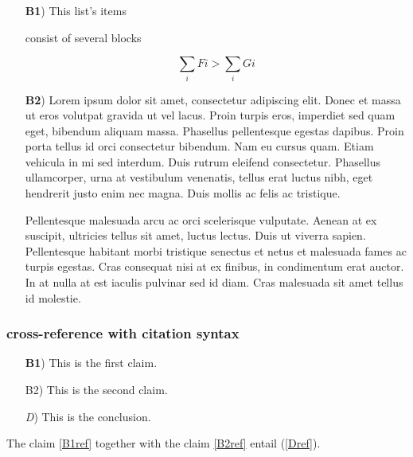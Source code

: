 \documentclass[
]{article}
\makeatletter
\providecommand{\tightlist}{%
  \setlength{\itemsep}{0pt}\setlength{\parskip}{0pt}}
\def\labelledlistlabel#1#2{\begingroup
    \def\@currentlabel{#2}%
    \label{#1}\endgroup
    }
\makeatother
\begin{document}
\begin{itemize}
\tightlist

\item[\textbf{B1})] This list's items

consist of several blocks

\[\sum_i Fi > \sum_i Gi\]

\item[\textbf{B2})] Lorem ipsum dolor sit amet, consectetur adipiscing
elit. Donec et massa ut eros volutpat gravida ut vel lacus. Proin turpis
eros, imperdiet sed quam eget, bibendum aliquam massa. Phasellus
pellentesque egestas dapibus. Proin porta tellus id orci consectetur
bibendum. Nam eu cursus quam. Etiam vehicula in mi sed interdum. Duis
rutrum eleifend consectetur. Phasellus ullamcorper, urna at vestibulum
venenatis, tellus erat luctus nibh, eget hendrerit justo enim nec magna.
Duis mollis ac felis ac tristique.

Pellentesque malesuada arcu ac orci scelerisque vulputate. Aenean at ex
suscipit, ultricies tellus sit amet, luctus lectus. Duis ut viverra
sapien. Pellentesque habitant morbi tristique senectus et netus et
malesuada fames ac turpis egestas. Cras consequat nisi at ex finibus, in
condimentum erat auctor. In at nulla at est iaculis pulvinar sed id
diam. Cras malesuada sit amet tellus id molestie.

\end{itemize}

\hypertarget{cross-reference-with-citation-syntax}{%
\subsubsection{cross-reference with citation
syntax}\label{cross-reference-with-citation-syntax}}

\begin{itemize}
\tightlist

\item[\textbf{B1})\labelledlistlabel{B1ref}{\textbf{B1}}] This is the
first claim.

\item[B2)\labelledlistlabel{B2ref}{B2}] This is the second claim.

\item[\emph{D})\labelledlistlabel{Dref}{\emph{D}}] This is the
conclusion.

\end{itemize}

The claim \ref{B1ref} together with the claim \ref{B2ref} entail
(\ref{Dref}).
\end{document}
